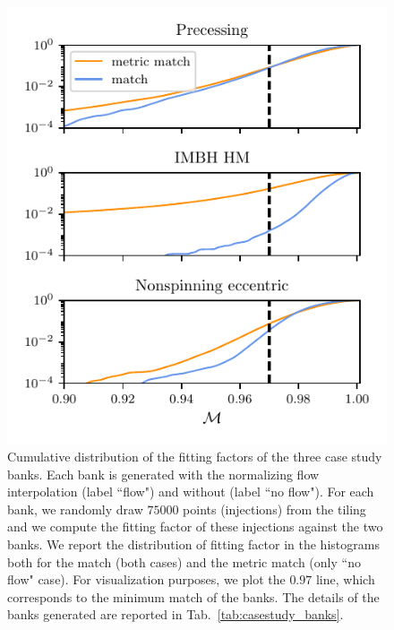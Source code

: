 \documentclass[twocolumn,showpacs,preprintnumbers,nofootinbib,prd,
superscriptaddress,10pt]{revtex4-2}
\begin{document}
\begin{figure}[t!]
	\includegraphics{bank_injections_flow}
	\caption{
	Cumulative distribution of the fitting factors of the three case study banks. Each bank is generated with the normalizing flow interpolation (label ``flow") and without (label ``no flow"). For each bank, we randomly draw $75000$ points (injections) from the tiling and we compute the fitting factor of these injections against the two banks. We report the distribution of fitting factor in the histograms both for the match (both cases) and the metric match (only ``no flow" case). For visualization purposes, we plot the $0.97$ line, which corresponds to the minimum match of the banks.
	The details of the banks generated are reported in Tab.~\ref{tab:casestudy_banks}.
	}
	\label{fig:bank_injections}
\end{figure}
\end{document}
